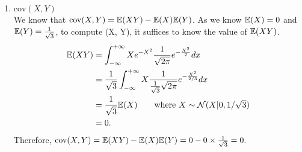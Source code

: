 \documentclass[12pt, fullpage,letterpaper]{article}
\def\blackblue{\color{black!40!blue}}
\begin{document}
\begin{enumerate}
\begin{enumerate}
{	}
	\item $\text{cov}(X, Y)$\\
	{\blackblue\noindent We know that $\text{cov}(X, Y)=\mathbb{E}(XY) - \mathbb{E}(X)\mathbb{E}(Y)$.
	As we know  $\mathbb{E}(X) = 0$ and $\mathbb{E}(Y)= {1\over \sqrt{3}}$, to compute (X, Y), it suffices to know the value of $\mathbb{E}(XY)$.
	\begin{align*}
	\mathbb{E}(XY) 
	& = \int_{-\infty}^{+\infty}Xe^{-X^2}{1\over \sqrt{2\pi}}e^{-{X^2\over 2}}dx\\
	& = {1\over \sqrt{3}}\int_{-\infty}^{+\infty}X{1\over {1\over \sqrt{3}}\sqrt{2\pi}}e^{-{X^2\over 2/3}}dx\\
	& = {1\over \sqrt{3}}\mathbb{E}(X)\qquad\mbox{where $X\sim \mathcal{N}(X|0, 1/\sqrt{3})$}\\
	& = 0.
	\end{align*}
	Therefore, 
	$\text{cov}(X, Y)=\mathbb{E}(XY) - \mathbb{E}(X)\mathbb{E}(Y) = 0 - 0\times  {1\over \sqrt{3}} = 0.$
	}
\end{enumerate}


\end{enumerate}
\end{document}
